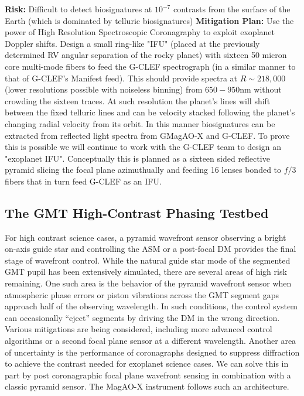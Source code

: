 \documentclass[12pt,preprint]{aastex}
\begin{document}
\textbf{Risk:} Difficult to detect biosignatures at $10^{-7}$ contrasts from the surface of the Earth (which is dominated by telluric biosignatures) \textbf{Mitigation Plan:} Use the power of High Resolution Spectroscopic Coronagraphy to exploit exoplanet Doppler shifts. Design a small ring-like "IFU" (placed at the previously determined RV angular separation of the rocky planet) with sixteen 50 micron core multi-mode fibers to feed the G-CLEF spectrograph (in a similar manner to that of G-CLEF’s Manifest feed). This should provide spectra at $R\sim218,000$ (lower resolutions possible with noiseless binning) from  $650-950$nm without crowding the sixteen traces. At such resolution the planet’s lines will shift between the fixed telluric lines and can be velocity stacked following the planet’s changing radial velocity from its orbit. In this manner biosignatures can be extracted from reflected light spectra from GMagAO-X and G-CLEF. To prove this is possible we will continue to work with the G-CLEF team to design an "exoplanet IFU". Conceptually this is planned as a sixteen sided reflective pyramid slicing the focal plane azimuthually and feeding 16 lenses bonded to $f/3$ fibers that in turn feed G-CLEF as an IFU. 

\subsection{The GMT High-Contrast Phasing Testbed}
\label{subsection:testbed}
For high contrast science cases, a pyramid wavefront sensor observing a bright on-axis guide star and controlling the ASM or a post-focal DM provides the final stage of wavefront control. While the natural guide star mode of the segmented GMT pupil has been extensively simulated, there are several areas of high risk remaining. One such area is the behavior of the pyramid wavefront sensor when atmospheric phase errors or piston vibrations across the GMT segment gaps approach half of the observing wavelength. In such conditions, the control system can occasionally “eject” segments by driving the DM in the wrong direction. Various mitigations are being considered, including more advanced control algorithms or a second focal plane sensor at a different wavelength. Another area of uncertainty is the performance of coronagraphs designed to suppress diffraction to achieve the contrast needed for exoplanet science cases. We can solve this in part by post coronagraphic focal plane wavefront sensing in combination with a classic pyramid sensor. The MagAO-X instrument follows such an architecture. 
\end{document}
